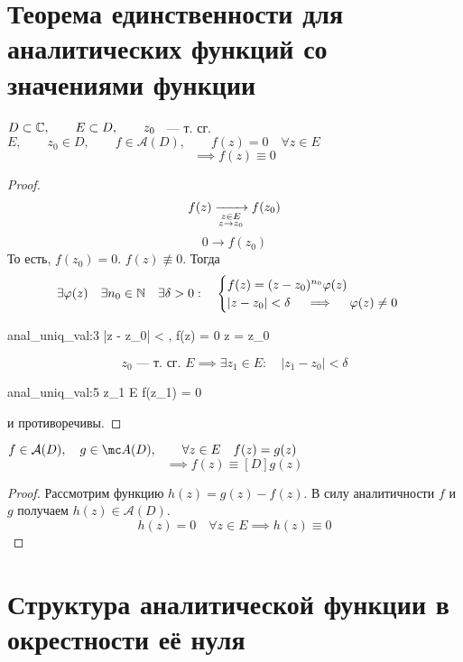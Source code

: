 \section{Теорема единственности для аналитических функций со значениями функции}

\begin{theorem}
	$ D \subset \mathbb{C}, \qquad E \subset D, \qquad z_0 $ ~--- т. сг. $ E, \qquad z_0 \in D, \qquad f \in \mathcal A(D), \qquad f(z) = 0 \quad \forall z \in E $
	$$ \implies f(z) \equiv 0 $$
\end{theorem}

\begin{proof}
	$$ f(z) \xrightarrow[
		\begin{subarray}{c}
			z \in E \\
			z \to z_0
		\end{subarray}]{} f(z_0) $$
	$$ 0 \to f(z_0) $$
	То есть, $ f(z_0) = 0 $.  $ f(z) \not\equiv 0 $. Тогда
	$$ \exists \varphi(z) \quad \exists n_0 \in \mathbb{N} \quad \exists \delta > 0 : \quad
	\begin{cases}
		f(z) = (z - z_0)^{n_0} \varphi(z) \\
		|z - z_0| < \delta \quad \implies \quad \varphi(z) \ne 0
	\end{cases} $$
	\begin{equ}{anal_uniq_val:3}
		\implies {} |z - z_0| < \delta, \quad f(z) = 0 \implies z = z_0
	\end{equ}
	$$ z_0 \text{~--- т. сг. } E \implies \exists z_1 \in E : \quad |z_1 - z_0| < \delta $$
	\begin{equ}{anal_uniq_val:5}
		z_1 \in E \implies f(z_1) = 0
	\end{equ}
	 и  противоречивы.
\end{proof}

\begin{implication}
	$ f \in \mathcal A(D), \quad g \in \mc A(D), \qquad \forall z \in E \quad f(z) = g(z) $
	$$ \implies f(z) \equiv[D] g(z) $$
\end{implication}

\begin{proof}
	Рассмотрим функцию $ h(z) = g(z) - f(z) $. В силу аналитичности $ f $ и $ g $ получаем $h(z) \in \mathcal A(D) $.
	$$ h(z) = 0 \quad \forall z \in E \implies h(z) \equiv 0 $$
\end{proof}

\section{Структура аналитической функции в окрестности её нуля}

